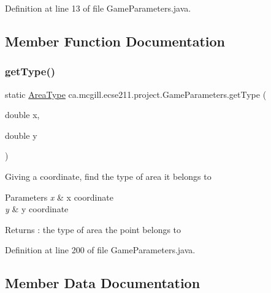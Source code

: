 Definition at line 13 of file Game\+Parameters.\+java.



\subsection{Member Function Documentation}
\mbox{\label{classca_1_1mcgill_1_1ecse211_1_1project_1_1_game_parameters_afa2d71de18f6276782a702d7b74066e3}} 
\subsubsection{\texorpdfstring{get\+Type()}{getType()}}
{\footnotesize\ttfamily static \hyperlink{enumca_1_1mcgill_1_1ecse211_1_1project_1_1_game_parameters_1_1_area_type}{Area\+Type} ca.\+mcgill.\+ecse211.\+project.\+Game\+Parameters.\+get\+Type (\begin{DoxyParamCaption}\item[{double}]{x,  }\item[{double}]{y }\end{DoxyParamCaption})\hspace{0.3cm}{\ttfamily [static]}}

Giving a coordinate, find the type of area it belongs to 
\begin{DoxyParams}{Parameters}
{\em x} & x coordinate \\
\hline
{\em y} & y coordinate \\
\hline
\end{DoxyParams}
\begin{DoxyReturn}{Returns}
\+: the type of area the point belongs to 
\end{DoxyReturn}


Definition at line 200 of file Game\+Parameters.\+java.



\subsection{Member Data Documentation}
\mbox{\label{classca_1_1mcgill_1_1ecse211_1_1project_1_1_game_parameters_ae6824f16adf03173062767f99d46b6e0}} 
